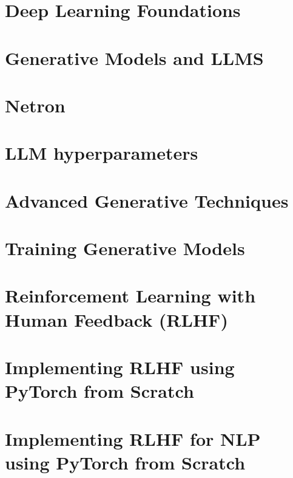 \documentclass[12pt]{book}
\begin{document}
\chapter{Deep Learning Foundations}


\chapter{Generative Models and LLMS}


\chapter{Netron}


\chapter{LLM hyperparameters}


\chapter{Advanced Generative Techniques}


\chapter{Training Generative Models}


\chapter{Reinforcement Learning with Human Feedback (RLHF)}


\chapter{Implementing RLHF using PyTorch from Scratch}


\chapter{Implementing RLHF for NLP using PyTorch from Scratch}

\end{document}
